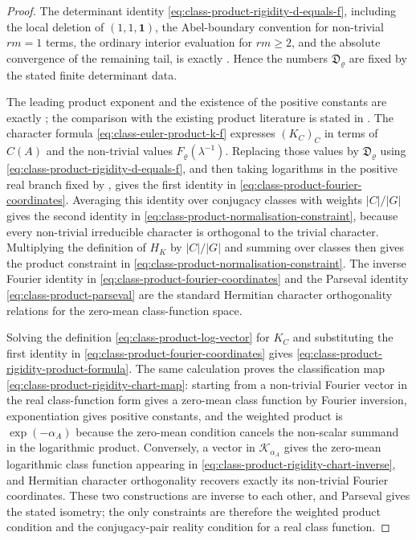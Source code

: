 \documentclass[11pt,a4paper]{amsart}
\theoremstyle{plain}
\theoremstyle{definition}
\theoremstyle{remark}
\begin{document}
\begin{proof}
  The determinant identity
  \eqref{eq:class-product-rigidity-d-equals-f}, including the local deletion
  of \((1,1,\mathbf1)\), the Abel-boundary convention for non-trivial
  \(rm=1\) terms, the ordinary interior evaluation for \(rm\ge2\), and the
  absolute convergence of the remaining tail, is exactly
  .  Hence the numbers
  \(\mathfrak D_\varrho\) are fixed by the stated finite determinant data.

  The leading product exponent and the existence of the positive constants
  are exactly ; the comparison with the
  existing product literature is stated in .
  The character formula \eqref{eq:class-euler-product-k-f} expresses
  \((K_C)_C\) in terms of \(C(A)\) and the non-trivial values
  \(F_\varrho(\lambda^{-1})\).  Replacing those values by
  \(\mathfrak D_\varrho\) using
  \eqref{eq:class-product-rigidity-d-equals-f}, and then taking logarithms in
  the positive real branch fixed by ,
  gives the first identity in \eqref{eq:class-product-fourier-coordinates}.
  Averaging this identity over conjugacy classes with weights \(|C|/|G|\)
  gives the second identity in
  \eqref{eq:class-product-normalisation-constraint}, because every
  non-trivial irreducible character is orthogonal to the trivial character.
  Multiplying the definition of \(H_K\) by \(|C|/|G|\) and summing over
  classes then gives the product constraint in
  \eqref{eq:class-product-normalisation-constraint}.  The inverse Fourier
  identity in \eqref{eq:class-product-fourier-coordinates} and the Parseval
  identity \eqref{eq:class-product-parseval} are the standard Hermitian
  character orthogonality relations for the zero-mean class-function space.

  Solving the definition \eqref{eq:class-product-log-vector} for \(K_C\) and
  substituting the first identity in
  \eqref{eq:class-product-fourier-coordinates} gives
  \eqref{eq:class-product-rigidity-product-formula}.  The same calculation
  proves the classification map
  \eqref{eq:class-product-rigidity-chart-map}: starting from a non-trivial
  Fourier vector in the real class-function form gives a zero-mean class
  function by Fourier inversion, exponentiation gives positive constants, and
  the weighted product is \(\exp(-\alpha_A)\) because the zero-mean condition
  cancels the non-scalar summand in the logarithmic product.  Conversely, a
  vector in \(\mathscr K_{\alpha_A}\) gives the zero-mean logarithmic class
  function appearing in \eqref{eq:class-product-rigidity-chart-inverse}, and
  Hermitian character orthogonality recovers exactly its non-trivial Fourier
  coordinates.  These two constructions are inverse to each other, and
  Parseval gives the stated isometry; the only constraints are therefore the
  weighted product condition and the conjugacy-pair reality condition for a
  real class function.


\end{proof}
\end{document}

